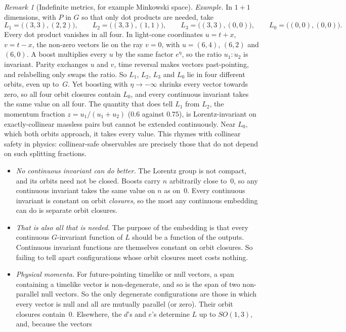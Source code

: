 \documentclass[11pt]{article}
\theoremstyle{definition}
\theoremstyle{remark}
\newtheorem{remark}{Remark}
\begin{document}
\begin{remark}[Indefinite metrics, for example Minkowski space]
\emph{Example.} In $1+1$ dimensions, with $P$ in $G$ so that only dot products
are needed, take
\[
  L_1 = \bigl((3,3), (2,2)\bigr), \qquad L_2 = \bigl((3,3), (1,1)\bigr), \qquad
  L_3 = \bigl((3,3), (0,0)\bigr), \qquad L_0 = \bigl((0,0), (0,0)\bigr).
\]
Every dot product vanishes in all four. In light-cone coordinates $u = t + x$,
$v = t - x$, the non-zero vectors lie on the ray $v = 0$, with
$u = (6,4)$, $(6,2)$ and $(6,0)$. A boost multiplies every $u$ by the same
factor $e^\eta$, so the ratio $u_1 : u_2$ is invariant. Parity exchanges $u$
and $v$, time reversal makes vectors past-pointing, and relabelling only swaps
the ratio. So $L_1$, $L_2$, $L_3$ and $L_0$ lie in four different orbits, even
up to~$G$. Yet boosting with $\eta \to -\infty$ shrinks every vector towards
zero, so all four orbit closures contain $L_0$, and every continuous invariant
takes the same value on all four. The quantity that does tell $L_1$ from $L_2$,
the momentum fraction $z = u_1/(u_1+u_2)$ ($0.6$ against $0.75$), is
Lorentz-invariant on exactly-collinear massless pairs but cannot be extended
continuously. Near $L_0$, which both orbits approach, it takes every value.
This rhymes with collinear safety in physics: collinear-safe observables are
precisely those that do not depend on such splitting fractions.
\begin{itemize}
  \item \emph{No continuous invariant can do better.} The Lorentz group is not
    compact, and its orbits need not be closed. Boosts carry $n$ arbitrarily
    close to~$0$, so any continuous invariant takes the same value on $n$ as
    on~$0$. Every continuous invariant is constant on orbit
    \emph{closures}, so the most any continuous embedding can do is separate
    orbit closures.
  \item \emph{That is also all that is needed.} The purpose of the embedding
    is that every continuous $G$-invariant function of $L$ should be a function
    of the outputs. Continuous invariant functions are themselves constant on
    orbit closures. So failing to tell apart configurations whose orbit
    closures meet costs nothing.
  \item \emph{Physical momenta.} For future-pointing timelike or null
    vectors, a span containing a timelike vector is non-degenerate, and so is
    the span of two non-parallel null vectors. So the only degenerate
    configurations are those in which every vector is null and all are
    mutually parallel (or zero). Their orbit closures contain~$0$. Elsewhere,
    the $d$'s and $e$'s determine $L$ up to $SO(1,3)$, and, because the vectors

\end{itemize}
\end{remark}
\end{document}
